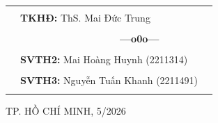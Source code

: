 \documentclass[a4paper]{report}
\theoremstyle{definition}
\begin{document}
\begin{titlepage}
\begin{table}[h]
\begin{tabular}{rll}
\\
\\
\hspace{6 cm}  &   \textbf{\Large TKHĐ:} {\Large ThS. Mai Đức Trung}
\\
\\
\hspace{6 cm} &     \textbf{$\;$ $\;$$\;$$\;$$\;$$\;$$\;$$\;$$\;$$\;$$\;$$\;$$\;$$\;$$\;$$\;$$\;$$\;$$\;$$\;$$\;$$\;$$\;$$\;$$\;$$\;$$\;$$\;$$\;$$\;$$\;$$\;$$\;$$\;$ \Large ---o0o---} 
\\
\\
\hspace{6 cm}&   \textbf{\Large SVTH2:}  {\Large Mai Hoàng Huynh (2211314)}
\\
\\
\hspace{6 cm} &   \textbf{\Large SVTH3:}  {\Large Nguyễn Tuấn Khanh (2211491)}
\\
\\
\end{tabular}
\end{table}
\vspace{0.5cm}
\begin{center}
{\Large TP. HỒ CHÍ MINH, 5/2026 }
\end{center}
\end{titlepage}
\newpage



\newpage
\tableofcontents
\newpage
\listoffigures
\newpage
\listoftables
\newpage
\setcounter{page}{1}


\newpage

\newpage

\newpage

\newpage

\newpage

\newpage

\newpage

\newpage

\newpage

\newpage

\end{document}
